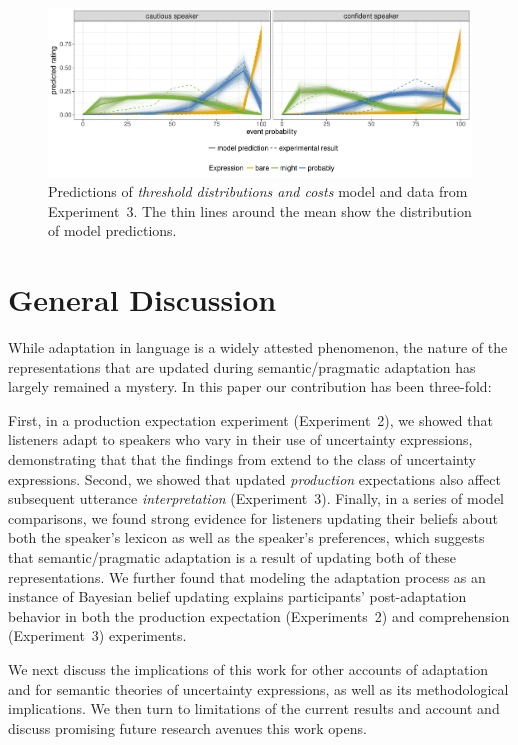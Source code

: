 \begin{figure}
\includegraphics[width=\textwidth]{plots/fig-15-adaptation-posterior-comp-data.pdf}
\caption{Predictions of \textit{threshold distributions and costs} model and data from Experiment~3. The thin lines around the mean show the distribution of model predictions.  \label{fig:post-exposure-comp-data}}
\end{figure}


\section{General Discussion}

While adaptation in language is a widely attested phenomenon, the nature of the representations that are updated during semantic/pragmatic adaptation has largely remained a mystery. In this paper our contribution has been three-fold: 

First, in a production expectation experiment (Experiment~2), we showed that listeners adapt to speakers who vary in their use of uncertainty expressions, demonstrating that that 
the findings from \cite{Yildirim2016} extend to the class of uncertainty expressions. Second, we showed that updated \emph{production} expectations also affect subsequent utterance \emph{interpretation}  (Experiment~3). Finally, in a series of model comparisons, we found strong evidence for listeners updating their beliefs about both the speaker's lexicon as well as the speaker's preferences, which suggests
that semantic/pragmatic adaptation is a result of updating both of these representations. We further found that modeling the adaptation process as an instance of Bayesian
belief updating explains participants' post-adaptation behavior in both the production expectation (Experiments~2) and comprehension (Experiment~3) experiments. 

We next discuss the implications of this work for other accounts of adaptation and for semantic theories of uncertainty expressions, as well as its methodological implications. We then turn to limitations of the current results and account and discuss promising future research avenues this work opens. 


